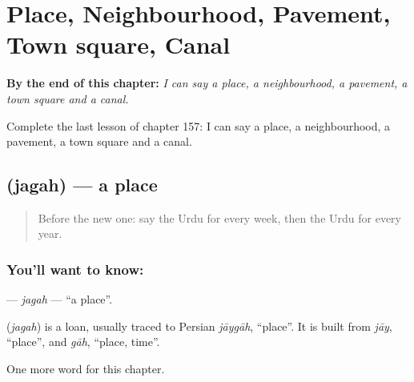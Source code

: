 
\chapter{Place, Neighbourhood, Pavement, Town square, Canal}
\label{ch:ur-place-neighbourhood-pavement-town-square-canal}

\begin{chapteropening}
\textbf{By the end of this chapter:} \emph{I can say a place, a neighbourhood, a pavement, a town square and a canal.}

Complete the last lesson of chapter 157: I can say a place, a neighbourhood, a pavement, a town square and a canal.
\end{chapteropening}

\section[\texorpdfstring{\ur{جگہ} (jagah)}{جگہ (jagah)}]{ (jagah) — a place}

\label{lesson:UR-C157-jagah}



\begin{quote}
Before the new one: say the Urdu for every week, then the Urdu for every year.
\end{quote}

\subsection*{You'll want to know: }
\textbf{} — \emph{jagah} — \textquotedblleft{}a place\textquotedblright{}.

\begin{cousinweb}
\textbf{} (\emph{jagah}) is a loan, usually traced to Persian \emph{jāygāh}, \textquotedblleft{}place\textquotedblright{}. It is built from \emph{jāy}, \textquotedblleft{}place\textquotedblright{}, and \emph{gāh}, \textquotedblleft{}place, time\textquotedblright{}.
\end{cousinweb}

\begin{grammarlens}[title={What you've built}]
One more word for this chapter.
\end{grammarlens}

